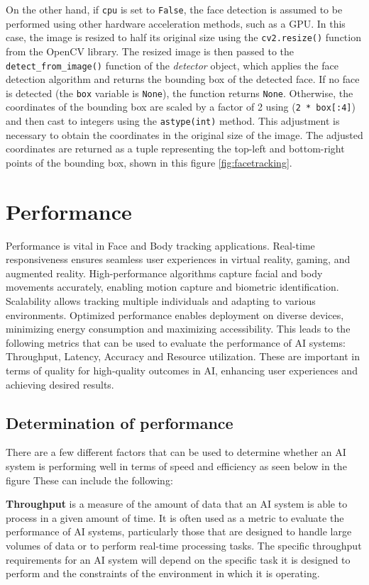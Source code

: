 On the other hand, if \texttt{cpu} is set to \texttt{False}, the face detection is assumed to be performed using other hardware acceleration methods, 
such as a GPU. In this case, the image is resized to half its original size using the \texttt{cv2.resize()} function from the OpenCV library. 
The resized image is then passed to the \texttt{detect\_from\_image()} function of the \emph{detector} object, which applies the face detection algorithm 
and returns the bounding box of the detected face. If no face is detected (the \texttt{box} variable is \texttt{None}), the function returns \texttt{None}. Otherwise, 
the coordinates of the bounding box are scaled by a factor of 2 using (\texttt{2 * box[:4]}) and then cast to integers using the \texttt{astype(int)} method. 
This adjustment is necessary to obtain the coordinates in the original size of the image. The adjusted coordinates are returned as a tuple 
representing the top-left and bottom-right points of the bounding box, shown in this figure \ref{fig:facetracking}.

\section{Performance}
Performance is vital in Face and Body tracking applications. Real-time responsiveness 
ensures seamless user experiences in virtual reality, gaming, and augmented reality. 
High-performance algorithms capture facial and body movements accurately, enabling 
motion capture and biometric identification. Scalability allows tracking multiple 
individuals and adapting to various environments. Optimized performance enables 
deployment on diverse devices, minimizing energy consumption and maximizing accessibility. This leads to 
the following metrics that can be used to evaluate the performance of AI systems: 
Throughput, Latency, Accuracy and Resource utilization. These are important in terms of quality for 
high-quality outcomes in AI, enhancing user experiences and achieving desired results. \cite{Performance}

\subsection{Determination of performance}
There are a few different factors that can be used to determine
whether an AI system is performing well in terms of speed and efficiency as seen below in the figure %
These can include the following:

\textbf{Throughput} is a measure of the amount of data that an AI system is able to process in a given amount of time.
It is often used as a metric to evaluate the performance of AI systems, particularly those that are designed
to handle large volumes of data or to perform real-time processing tasks. The specific throughput
requirements for an AI system will depend on the specific task it is designed to perform and the
constraints of the environment in which it is operating.

